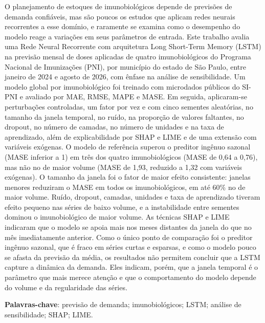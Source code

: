 \documentclass[
    12pt,
    openright,
    oneside,
    a4paper,
    english,
    brazil
]{abntex2}
\begin{document}
\frenchspacing

\pretextual

\imprimircapa
\imprimirfolhaderosto

\begin{resumo}
O planejamento de estoques de imunobiológicos depende de previsões de demanda confiáveis, mas são poucos os estudos que aplicam redes neurais recorrentes a esse domínio, e raramente se examina como o desempenho do modelo reage a variações em seus parâmetros de entrada. Este trabalho avalia uma Rede Neural Recorrente com arquitetura Long Short-Term Memory (LSTM) na previsão mensal de doses aplicadas de quatro imunobiológicos do Programa Nacional de Imunizações (PNI), por município do estado de São Paulo, entre janeiro de 2024 e agosto de 2026, com ênfase na análise de sensibilidade. Um modelo global por imunobiológico foi treinado com microdados públicos do SI-PNI e avaliado por MAE, RMSE, MAPE e MASE. Em seguida, aplicaram-se perturbações controladas, um fator por vez e com cinco sementes aleatórias, no tamanho da janela temporal, no ruído, na proporção de valores faltantes, no dropout, no número de camadas, no número de unidades e na taxa de aprendizado, além de explicabilidade por SHAP e LIME e de uma extensão com variáveis exógenas. O modelo de referência superou o preditor ingênuo sazonal (MASE inferior a 1) em três dos quatro imunobiológicos (MASE de 0,64 a 0,76), mas não no de maior volume (MASE de 1,93, reduzido a 1,32 com variáveis exógenas). O tamanho da janela foi o fator de maior efeito consistente: janelas menores reduziram o MASE em todos os imunobiológicos, em até 60\% no de maior volume. Ruído, dropout, camadas, unidades e taxa de aprendizado tiveram efeito pequeno nas séries de baixo volume, e a instabilidade entre sementes dominou o imunobiológico de maior volume. As técnicas SHAP e LIME indicaram que o modelo se apoia mais nos meses distantes da janela do que no mês imediatamente anterior. Como o único ponto de comparação foi o preditor ingênuo sazonal, que é fraco em séries curtas e esparsas, e como o modelo pouco se afasta da previsão da média, os resultados não permitem concluir que a LSTM capture a dinâmica da demanda. Eles indicam, porém, que a janela temporal é o parâmetro que mais merece atenção e que o comportamento do modelo depende do volume e da regularidade das séries.

\textbf{Palavras-chave}: previsão de demanda; imunobiológicos; LSTM; análise de sensibilidade; SHAP; LIME.
\end{resumo}
\end{document}
